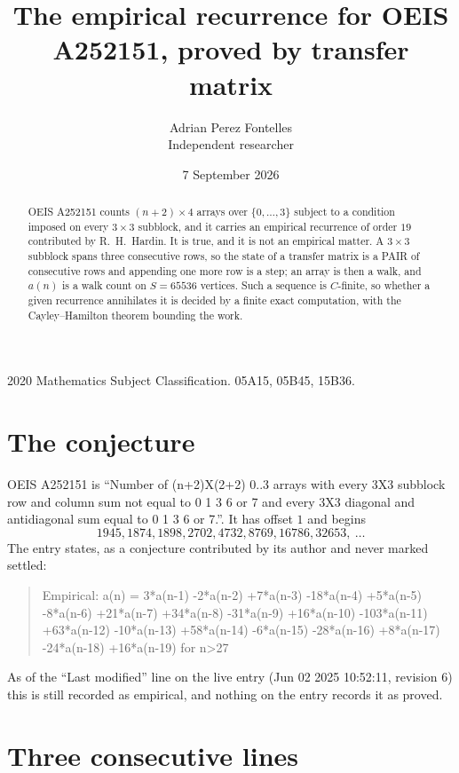 \documentclass[11pt,a4paper]{article}
\title{The empirical recurrence for OEIS A252151, proved by transfer matrix}
\author{Adrian Perez Fontelles\\ \small Independent researcher}
\date{7 September 2026}
\theoremstyle{plain}
\theoremstyle{definition}
\begin{document}
\maketitle

\begin{abstract}
OEIS A252151 counts $(n+2)\times4$ arrays over $\{0,\dots,3\}$ subject to a condition imposed on
every $3\times3$ subblock, and it carries an empirical recurrence of order $19$
contributed by R.~H.~Hardin. It is true, and it is not an empirical matter. A $3\times3$
subblock spans three consecutive rows, so the state of a transfer matrix is a PAIR of
consecutive rows and appending one more row is a step; an array is then a walk, and
$a(n)$ is a walk count on $S=65536$ vertices. Such a sequence is $C$-finite, so whether a given
recurrence annihilates it is decided by a finite exact computation, with the Cayley--Hamilton
theorem bounding the work.
\end{abstract}

\noindent\small 2020 Mathematics Subject Classification. 05A15, 05B45, 15B36.\normalsize

\section{The conjecture}

OEIS A252151 is ``Number of (n+2)X(2+2) 0..3 arrays with every 3X3 subblock row and column sum not equal to 0 1 3 6 or 7 and every 3X3 diagonal and antidiagonal sum equal to 0 1 3 6 or 7.''. It has offset $1$ and begins
\[
1945, 1874, 1898, 2702, 4732, 8769, 16786, 32653,\ \dots
\]
The entry states, as a conjecture contributed by its author and never marked settled:
\begin{quote}
Empirical: a(n) = 3*a(n-1) -2*a(n-2) +7*a(n-3) -18*a(n-4) +5*a(n-5) -8*a(n-6) +21*a(n-7) +34*a(n-8) -31*a(n-9) +16*a(n-10) -103*a(n-11) +63*a(n-12) -10*a(n-13) +58*a(n-14) -6*a(n-15) -28*a(n-16) +8*a(n-17) -24*a(n-18) +16*a(n-19) for n>27
\end{quote}
As of the ``Last modified'' line on the live entry (Jun 02 2025 10:52:11, revision 6) this is still
recorded as empirical, and nothing on the entry records it as proved.

\section{Three consecutive lines}
\end{document}
